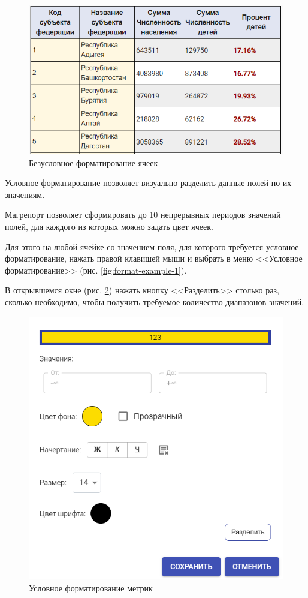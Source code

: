 \documentclass[../user-manual.tex]{subfiles}
\begin{document}
	\begin{figure}[h]
		\centering
		\includegraphics[width=\graphicswidth]{img/16-format-example.png}
		\caption{Безусловное форматирование ячеек}
		\label{fig:format-example-2}
	\end{figure}

	Условное форматирование позволяет визуально разделить данные полей по их значениям.
	
	Магрепорт позволяет сформировать до 10 непрерывных периодов значений полей, для каждого из которых можно задать цвет ячеек.
	
	Для этого на любой ячейке со значением поля, для которого требуется условное форматирование, нажать правой клавишей мыши и выбрать в меню <<Условное форматирование>> (рис. \ref{fig:format-example-1}).
	
	В открывшемся окне  (рис. \ref{fig:conditional-format-1}) нажать кнопку <<Разделить>> столько раз, сколько необходимо, чтобы получить требуемое количество диапазонов значений.
	
	\begin{figure}[h]
		\centering
		\includegraphics[width=\graphicswidth]{img/17-conditional-format.png}
		\caption{Условное форматирование метрик}
		\label{fig:conditional-format-1}
	\end{figure}
	
\end{document}

